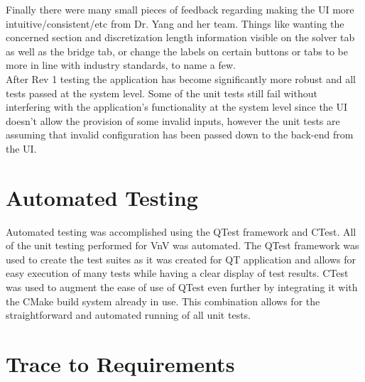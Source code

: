 \documentclass[12pt, titlepage]{article}
\begin{document}
Finally there were many small pieces of feedback regarding making the UI more intuitive/consistent/etc from Dr. Yang and her team. Things like wanting the concerned section
and discretization length information visible on the solver tab as well as the bridge tab, or change the labels on certain buttons or tabs to be more in line with industry
standards, to name a few.\\

After Rev 1 testing the application has become significantly more robust and all tests passed at the system level. Some of the unit tests still fail without interfering with the application's functionality at the system level since the UI doesn't allow the provision of some invalid inputs, however the unit tests are assuming that invalid configuration has been passed down to the back-end from the UI.

\section{Automated Testing}
Automated testing was accomplished using the QTest framework and CTest. All of the unit testing performed for VnV was automated. The QTest framework was used to create the test suites as it was created for QT application and allows for easy execution of many tests while having a clear display of test results. CTest was used to augment the ease of use of QTest even further by integrating it with the CMake build system already in use. This combination allows for the straightforward and automated running of all unit tests.

\section{Trace to Requirements}
\end{document}
